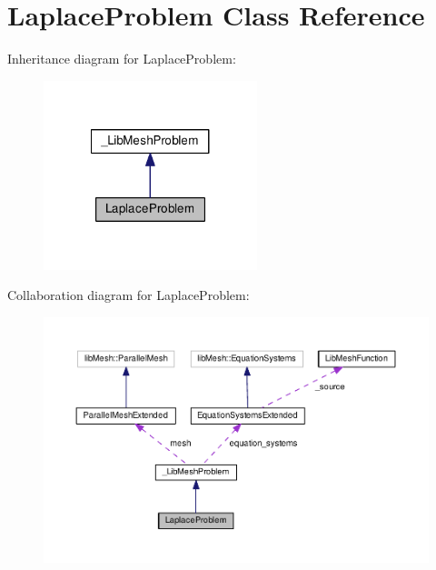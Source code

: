 \hypertarget{class_laplace_problem}{\section{Laplace\-Problem Class Reference}
\label{class_laplace_problem}
}


Inheritance diagram for Laplace\-Problem\-:\nopagebreak
\begin{figure}[H]
\begin{center}
\leavevmode
\includegraphics[width=176pt]{class_laplace_problem__inherit__graph}
\end{center}
\end{figure}


Collaboration diagram for Laplace\-Problem\-:\nopagebreak
\begin{figure}[H]
\begin{center}
\leavevmode
\includegraphics[width=350pt]{class_laplace_problem__coll__graph}
\end{center}
\end{figure}
